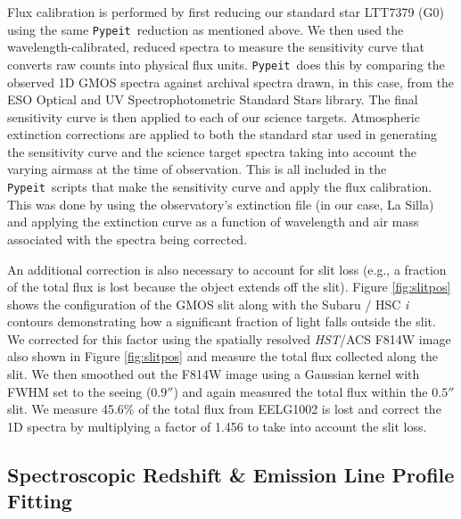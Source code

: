 \documentclass[twocolumn,tight,times,linenumbers]{aastex631}
\newcommand{\pypeit}{\texttt{Pypeit}}
\newcommand{\zzz}{{\color{red} ZZZ}}
\begin{document}
		Flux calibration is performed by first reducing our standard star LTT7379 (G0) using the same \pypeit~reduction as mentioned above. We then used the wavelength-calibrated, reduced spectra to measure the sensitivity curve that converts raw counts into physical flux units. \pypeit~does this by comparing the observed 1D GMOS spectra against archival spectra drawn, in this case, from the ESO Optical and UV Spectrophotometric Standard Stars library. The final sensitivity curve is then applied to each of our science targets. Atmospheric extinction corrections are applied to both the standard star used in generating the sensitivity curve and the science target spectra taking into account the varying airmass at the time of observation. This is all included in the \pypeit~scripts that make the sensitivity curve and apply the flux calibration. This was done by using the observatory's extinction file (in our case, La Silla) and applying the extinction curve as a function of wavelength and air mass associated with the spectra being corrected.
		
		An additional correction is also necessary to account for slit loss (e.g., a fraction of the total flux is lost because the object extends off the slit). Figure \ref{fig:slitpos} shows the configuration of the GMOS slit along with the Subaru / HSC \textit{i} contours demonstrating how a significant fraction of light falls outside the slit. We corrected for this factor using the spatially resolved \textit{HST}/ACS F814W image also shown in Figure \ref{fig:slitpos} and measure the total flux collected along the slit. We then smoothed out the F814W image using a Gaussian kernel with FWHM set to the seeing ($0.9''$) and again measured the total flux within the $0.5''$ slit. We measure 45.6\% of the total flux from EELG1002 is lost and correct the 1D spectra by multiplying a factor of 1.456 to take into account the slit loss.
		
		\subsection{Spectroscopic Redshift \& Emission Line Profile Fitting}
		\label{sec:specz_line_profile}
		
\end{document}
